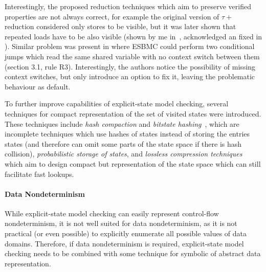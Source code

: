 Interestingly, the proposed reduction techniques which aim to preserve verified properties are not always correct, for example the original version of $\tau+$ reduction considered only stores to be visible, but it was later shown that repeated loads have to be also visible (shown by me in~\cite{S2016}, acknowledged an fixed in \cite[Section 6]{RSCB2018}).
Similar problem was present in \cite{Cordeiro2011} where ESBMC could perform two conditional jumps which read the same shared variable with no context switch between them (section 3.1, rule R3).
Interestingly, the authors notice the possibility of missing context switches, but only introduce an option to fix it, leaving the problematic behaviour as default.

To further improve capabilities of explicit-state model checking, several
techniques for compact representation of the set of visited states were
introduced.
These techniques include \emph{hash compaction} and \emph{bitstate
hashing}~\cite{Holzmann1998}, which are incomplete techniques which use hashes
of states instead of storing the entries states (and therefore can omit some
parts of the state space if there is hash collision),
\emph{probabilistic storage of states}, and
\emph{lossless compression techniques}~\cite{RSB15TC,Laarman2019} which aim to design compact but representation of the state space which can still facilitate fast lookups.

\paragraph{Data Nondeterminism}
While explicit-state model checking can easily represent control-flow
nondeterminism, it is not well suited for data nondeterminism, as it is not
practical (or even possible) to explicitly enumerate all possible values of
data domains.
Therefore, if data nondeterminism is required, explicit-state model checking
needs to be combined with some technique for symbolic of abstract data
representation.

